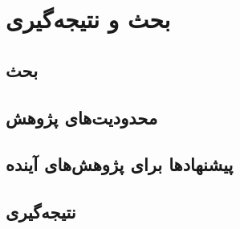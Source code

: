 \ChapterStart
\chapter{بحث و نتیجه‌گیری}
\label{ch:discussion}

\section{بحث}
\label{sec:discussion}



\section{محدودیت‌های پژوهش}

\section{پیشنهادها برای پژوهش‌های آینده}

\section{نتیجه‌گیری}